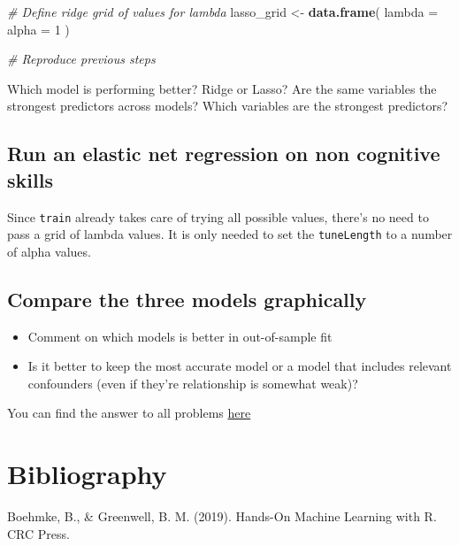 \documentclass[
]{book}
\newenvironment{Shaded}{\begin{snugshade}}{\end{snugshade}}
\newcommand{\CommentTok}[1]{\textcolor[rgb]{0.56,0.35,0.01}{\textit{#1}}}
\newcommand{\DataTypeTok}[1]{\textcolor[rgb]{0.13,0.29,0.53}{#1}}
\newcommand{\DecValTok}[1]{\textcolor[rgb]{0.00,0.00,0.81}{#1}}
\newcommand{\KeywordTok}[1]{\textcolor[rgb]{0.13,0.29,0.53}{\textbf{#1}}}
\newcommand{\NormalTok}[1]{#1}
\newcommand{\StringTok}[1]{\textcolor[rgb]{0.31,0.60,0.02}{#1}}
\providecommand{\tightlist}{%
  \setlength{\itemsep}{0pt}\setlength{\parskip}{0pt}}
\begin{document}
\begin{Shaded}
\begin{Highlighting}[]
\CommentTok{# Define ridge grid of values for lambda}
\NormalTok{lasso_grid <-}\StringTok{ }\KeywordTok{data.frame}\NormalTok{(}
  \DataTypeTok{lambda =} 
  \DataTypeTok{alpha =} \DecValTok{1}
\NormalTok{)}

\CommentTok{# Reproduce previous steps}
\end{Highlighting}
\end{Shaded}

Which model is performing better? Ridge or Lasso? Are the same variables the strongest predictors across models? Which variables are the strongest predictors?

\hypertarget{run-an-elastic-net-regression-on-non-cognitive-skills}{%
\subsection{Run an elastic net regression on non cognitive skills}\label{run-an-elastic-net-regression-on-non-cognitive-skills}}

Since \texttt{train} already takes care of trying all possible values, there's no need to pass a grid of lambda values. It is only needed to set the \texttt{tuneLength} to a number of alpha values.

\hypertarget{compare-the-three-models-graphically}{%
\subsection{Compare the three models graphically}\label{compare-the-three-models-graphically}}

\begin{itemize}
\tightlist
\item
  Comment on which models is better in out-of-sample fit
\item
  Is it better to keep the most accurate model or a model that includes relevant confounders (even if they're relationship is somewhat weak)?
\end{itemize}

You can find the answer to all problems \href{./answers/02_regularization.R}{here}

\hypertarget{bibliography}{%
\section{Bibliography}\label{bibliography}}

Boehmke, B., \& Greenwell, B. M. (2019). Hands-On Machine Learning with R. CRC Press.
\end{document}
